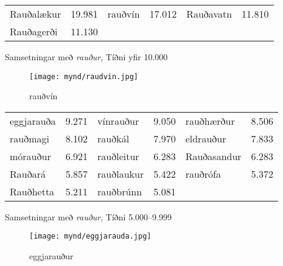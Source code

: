 \documentclass[../samsetningasafn.tex]{subfiles}
\begin{document}
\begin{wordlist}[H]
\begin{tcolorbox}

	\setlength{\extrarowheight}{3pt} 
	\begin{tabular}{BlBlBl}
		Rauðalækur		& 19.981	& 
		rauðvín			& 17.012	& 
		Rauðavatn		& 11.810	\\ 
		Rauðagerði		& 11.130	& 
						&			&
						&
	\end{tabular}

\end{tcolorbox}
	\caption{Samsetningar með \textit{rauður}, Tíðni yfir 10.000}
	\label{listi:rautt.10000}
\end{wordlist}
	
\begin{figure}[H]
\begin{tcolorbox}
\centering
	\texttt{[image: mynd/raudvin.jpg]}
\end{tcolorbox}
	\caption{rauðvín}
	\label{mynd:raudvin}
\end{figure}

\begin{wordlist}[H]
\begin{tcolorbox}

	\setlength{\extrarowheight}{3pt}
	\begin{tabular}{BlBlBl}
		eggjarauða	& 9.271		& 	
		vínrauður	& 9.050		& 	
		rauðhærður	& 8.506		\\  
		rauðmagi	& 8.102		& 	
		rauðkál		& 7.970		&  
		eldrauður	& 7.833		\\  
		mórauður	& 6.921		& 
		rauðleitur	& 6.283		& 	
		Rauðasandur	& 6.283		\\ 
		Rauðará		& 5.857		& 	
		rauðlaukur	& 5.422		& 	
		rauðrófa		& 5.372		\\ 
		Rauðhetta	& 5.211		& 	
		rauðbrúnn	& 5.081		& 
					&			
	\end{tabular}

\end{tcolorbox}
	\caption{Samsetningar með \textit{rauður}, Tíðni 5.000--9.999}
	\label{listi:rautt.5000}
\end{wordlist}

\begin{figure}[H]
\begin{tcolorbox}
\centering
	\texttt{[image: mynd/eggjarauda.jpg]}
\end{tcolorbox}
	\caption{eggjarauður}
	\label{mynd:eggjarauda}
\end{figure}
\end{document}

